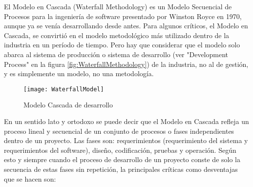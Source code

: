 El Modelo en Cascada (Waterfall Methodology) \cite{Ken-Schwaber-1995} es un Modelo Secuencial de Procesos para la ingeniería de software presentado por Winston Royce en 1970, aunque ya se venía desarrollando desde antes. Para algunos críticos, el Modelo en Cascada, se convirtió en el modelo metodológico más utilizado dentro de la industria en un período de tiempo. Pero hay que considerar que el modelo solo abarca al sistema de producción o sistema de desarrollo (ver "Development Process" en la figura \ref{fig:WaterfallMethodology}) de la industria, no al de gestión, y es simplemente un modelo, no una metodología.

\begin{figure}[h]
  \centering
  \texttt{[image: WaterfallModel]}
  \caption{Modelo Cascada de desarrollo}
  \centering
  \label{fig:WaterfallModel} %
\end{figure}

En un sentido lato y ortodoxo se puede decir que el Modelo en Cascada refleja un proceso lineal y secuencial de un conjunto de procesos o fases independientes dentro de un proyecto. Las fases son: requerimientos (requerimiento del sistema y requerimientos del software), diseño, codificación, pruebas y operación. Según esto y siempre cuando el proceso de desarrollo de un proyecto conste de solo la secuencia de estas fases sin repetición, la principales críticas como desventajas que se hacen son:

